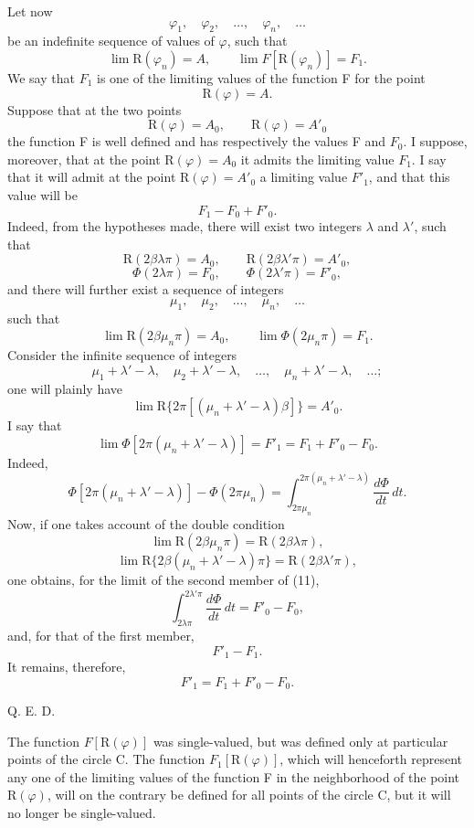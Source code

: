 \documentclass[11pt]{article}
\begin{document}
Let now
\[
\varphi_1,
\quad \varphi_2,
\quad \ldots,
\quad \varphi_n,
\quad \ldots
\]
be an indefinite sequence of values of $\varphi$, such that
\[
\lim \mathrm{R}(\varphi_n)=A,
\qquad
\lim F[\mathrm{R}(\varphi_n)]=F_1.
\]
We say that $F_1$ is one of the limiting values of the function F for the point
\[
\mathrm{R}(\varphi)=A.
\]
Suppose that at the two points
\[
\mathrm{R}(\varphi)=A_0,
\qquad
\mathrm{R}(\varphi)=A'_0
\]
the function F is well defined and has respectively the values F and $F_0$. I suppose, moreover, that at the point $\mathrm{R}(\varphi)=A_0$ it admits the limiting value $F_1$. I say that it will admit at the point $\mathrm{R}(\varphi)=A'_0$ a limiting value $F'_1$, and that this value will be
\[
F_1-F_0+F'_0.
\]
Indeed, from the hypotheses made, there will exist two integers $\lambda$ and $\lambda'$, such that
\[
\mathrm{R}(2\beta\lambda\pi)=A_0,
\qquad
\mathrm{R}(2\beta\lambda'\pi)=A'_0,
\]
\[
\Phi(2\lambda\pi)=F_0,
\qquad
\Phi(2\lambda'\pi)=F'_0,
\]
and there will further exist a sequence of integers
\[
\mu_1,
\quad \mu_2,
\quad \ldots,
\quad \mu_n,
\quad \ldots
\]
such that
\[
\lim \mathrm{R}(2\beta\mu_n\pi)=A_0,
\qquad
\lim \Phi(2\mu_n\pi)=F_1.
\]
Consider the infinite sequence of integers
\[
\mu_1+\lambda'-\lambda,
\quad
\mu_2+\lambda'-\lambda,
\quad \ldots,
\quad
\mu_n+\lambda'-\lambda,
\quad \ldots;
\]
one will plainly have
\[
\lim \mathrm{R}\{2\pi[(\mu_n+\lambda'-\lambda)\beta]\}=A'_0.
\]
I say that
\[
\lim\Phi[2\pi(\mu_n+\lambda'-\lambda)]=F'_1=F_1+F'_0-F_0.
\]
Indeed,
\begin{equation}
\Phi[2\pi(\mu_n+\lambda'-\lambda)]-\Phi(2\pi\mu_n)
=\int_{2\pi\mu_n}^{2\pi(\mu_n+\lambda'-\lambda)}\frac{d\Phi}{dt}\,dt.
\tag{11}
\end{equation}
Now, if one takes account of the double condition
\[
\lim \mathrm{R}(2\beta\mu_n\pi)=\mathrm{R}(2\beta\lambda\pi),
\]
\[
\lim \mathrm{R}\{2\beta(\mu_n+\lambda'-\lambda)\pi\}=\mathrm{R}(2\beta\lambda'\pi),
\]
one obtains, for the limit of the second member of (11),
\[
\int_{2\lambda\pi}^{2\lambda'\pi}\frac{d\Phi}{dt}\,dt=F'_0-F_0,
\]
and, for that of the first member,
\[
F'_1-F_1.
\]
It remains, therefore,
\[
F'_1=F_1+F'_0-F_0.
\]
\begin{flushright}Q. E. D.\end{flushright}

The function $F[\mathrm{R}(\varphi)]$ was single-valued, but was defined only at particular points of the circle C. The function $F_1[\mathrm{R}(\varphi)]$, which will henceforth represent any one of the limiting values of the function F in the neighborhood of the point $\mathrm{R}(\varphi)$, will on the contrary be defined for all points of the circle C, but it will no longer be single-valued.
\end{document}
